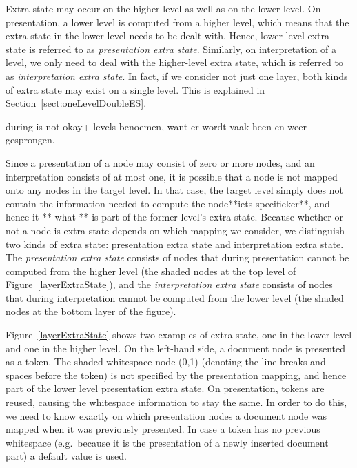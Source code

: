 
Extra state may occur on the higher level as well as on the lower level. On presentation, a lower level is computed from a higher level, which means that the extra state in the lower level needs to be dealt with. Hence, lower-level extra state is referred to as {\em presentation extra state}. Similarly, on interpretation of a level, we only need to deal with the higher-level extra state, which is referred to as {\em interpretation extra state}. In fact, if we consider not just one layer, both kinds of extra state may exist on a single level. This is explained in Section~\ref{sect:oneLevelDoubleES}.

\bc
during is not okay+ levels benoemen, want er wordt vaak heen en weer gesprongen.

Since a presentation of a node may consist of zero or more nodes, and an interpretation consists of at most one, it is possible that a node is not mapped onto any nodes in the target level. In that case, the target level simply does not contain the information needed to compute the node**iets specifieker**, and hence it ** what ** is part of the former level's extra state. Because whether or not a node is extra state depends on which mapping we consider, we distinguish two kinds of extra state: presentation extra state and interpretation extra state. The {\em presentation extra state} consists of nodes that during presentation cannot be computed from the higher level (the shaded nodes at the top level of Figure~\ref{layerExtraState}), and the {\em interpretation extra state} consists of nodes that during interpretation cannot be computed from the lower level (the shaded nodes at the bottom layer of the figure).
\ec


Figure~\ref{layerExtraState} shows two examples of extra state, one in the lower level and one in the higher level. On the left-hand side, a document node is presented as a token. The shaded whitespace node (0,1) (denoting the line-breaks and spaces before the token) is not specified by the presentation mapping, and hence part of the lower level presentation extra state. On presentation, tokens are reused, causing the whitespace information to stay the same. In order to do this, we need to know exactly on which presentation nodes a document node was mapped when it was previously presented. In case a token has no previous whitespace (e.g.\ because it is the presentation of a newly inserted document part) a default value is used.

